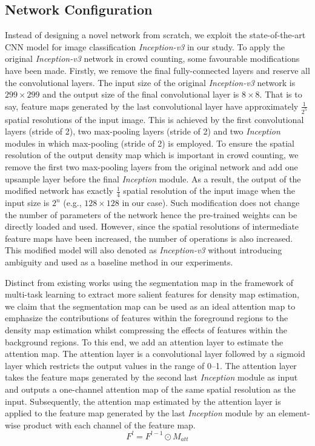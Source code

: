 \documentclass[journal,comsoc]{IEEEtran}
\begin{document}
\subsection{Network Configuration} \label{sec:architecture}
Instead of designing a novel network from scratch, we exploit the state-of-the-art CNN model for image classification \textit{Inception-v3} in our study. 
To apply the original \textit{Inception-v3} network in crowd counting, some favourable modifications have been made. Firstly, we remove the final fully-connected layers and reserve all the convolutional layers. The input size of the original \textit{Inception-v3} network is $299\times299$ and the output size of the final convolutional layer is $8\times8$. That is to say, feature maps generated by the last convolutional layer have approximately $\frac{1}{2^5}$ spatial resolutions of the input image. This is achieved by the first convolutional layers (stride of 2), two max-pooling layers (stride of 2) and two \textit{Inception} modules in which max-pooling (stride of 2) is employed. To ensure the spatial resolution of the output density map which is important in crowd counting, we remove the first two max-pooling layers from the original network and add one upsample layer before the final \textit{Inception} module. As a result, the output of the modified network has exactly $\frac{1}{4}$ spatial resolution of the input image when the input size is $2^n$ (e.g., $128\times128$ in our case). Such modification does not change the number of parameters of the network hence the pre-trained weights can be directly loaded and used. However, since the spatial resolutions of intermediate feature maps have been increased, the number of operations is also increased. This modified model will also denoted as \textit{Inception-v3} without introducing ambiguity and used as a baseline method in our experiments.

Distinct from existing works using the segmentation map in the framework of multi-task learning \cite{zhao2019leveraging} to extract more salient features for density map estimation, we claim that the segmentation map can be used as an ideal attention map to emphasize the contributions of features within the foreground regions to the density map estimation whilst compressing the effects of features within the background regions. To this end, we add an attention layer to estimate the attention map. The attention layer is a convolutional layer followed by a sigmoid layer which restricts the output values in the range of 0--1. The attention layer takes the feature maps generated by the second last \textit{Inception} module as input and outputs a one-channel attention map of the same spatial resolution as the input. Subsequently, the attention map estimated by the attention layer is applied to the feature map generated by the last \textit{Inception} module by an element-wise product with each channel of the feature map.
\begin{equation}
    \label{eq:attention}
    F^l = F^{l-1} \odot M_{att}
\end{equation}
\end{document}
